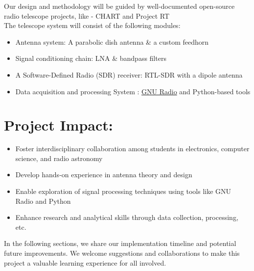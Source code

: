 \documentclass[12pt]{report}
\begin{document}
\begin{titlepage}
\begin{flushleft}
    \medskip

    Our design and methodology will be guided by well-documented open-source radio telescope projects, like - CHART \cite{ref1} and Project RT \cite{ref4}\\
    The telescope system will consist of the following modules:
    \begin{itemize}[leftmargin=1.5em]
        \item Antenna system: A parabolic dish antenna \& a custom feedhorn
        \item Signal conditioning chain: LNA \& bandpass filters
        \item A Software-Defined Radio (SDR) receiver: RTL-SDR with a dipole antenna
        \item Data acquisition and processing System :  \href{https://github.com/gnuradio}{GNU Radio} and Python-based tools
    \end{itemize}

    \medskip
    \section*{Project Impact:}
    \begin{itemize}
        \item Foster interdisciplinary collaboration among students in electronics, computer science, and radio astronomy
        \item Develop hands-on experience in antenna theory and design
        \item Enable exploration of signal processing techniques using tools like GNU Radio and Python
        \item Enhance research and analytical skills through data collection, processing, etc. 
    \end{itemize}

    In the following sections, we share our implementation timeline and potential future improvements. We welcome suggestions and collaborations to make this project a valuable learning experience for all involved.

    \medskip
    \end{flushleft}
\end{titlepage}
\end{document}
